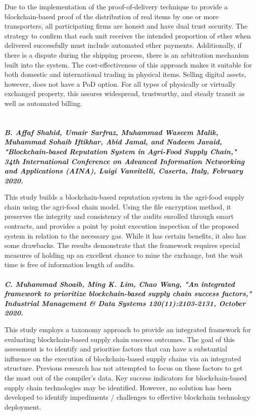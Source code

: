 \documentclass[12pt,a4paper,twocolumn,fleqn]{article}
\begin{document}
Due to the implementation of the proof-of-delivery technique to provide a blockchain-based proof of the distribution of real items by one or more transporters, all participating firms are honest and have dual trust security. The strategy to confirm that each unit receives the intended proportion of ether when delivered successfully must include automated ether payments. Additionally, if there is a dispute during the shipping process, there is an arbitration mechanism built into the system. The cost-effectiveness of this approach makes it suitable for both domestic and international trading in physical items. Selling digital assets, however, does not have a PoD option. For all types of physically or virtually exchanged property, this assures widespread, trustworthy, and steady transit as well as automated billing. \\ \\ \\

\textbf{\emph {B. Affaf Shahid, Umair Sarfraz, Muhammad Waseem Malik, Muhammad Sohaib Iftikhar, Abid Jamal, and Nadeem Javaid, "Blockchain-based Reputation System in Agri-Food Supply Chain," 34th International Conference on Advanced Information Networking and Applications (AINA), Luigi Vanvitelli, Caserta, Italy, February 2020.}}

This study builds a blockchain-based reputation system in the agri-food supply chain using the agri-food chain model. Using the file encryption method, it preserves the integrity and consistency of the audits enrolled through smart contracts, and provides a point by point execution inspection of the proposed system in relation to the necessary gas. While it has certain benefits, it also has some drawbacks. The results demonstrate that the framework requires special measures of holding up an excellent chance to mine the exchange, but the wait time is free of information length of audits. \\ \\

\textbf{\emph {C. Muhammad Shoaib, Ming K. Lim, Chao Wang, "An integrated framework to prioritize blockchain-based supply chain success factors," Industrial Management \& Data Systems 120(11):2103-2131, October 2020.}}

This study employs a taxonomy approach to provide an integrated framework for evaluating blockchain-based supply chain success outcomes. The goal of this assessment is to identify and prioritise factors that can have a substantial influence on the execution of blockchain-based supply chains via an integrated structure. Previous research has not attempted to focus on these factors to get the most out of the compiler's data. Key success indicators for blockchain-based supply chain technologies may be identified. However, no solution has been developed to identify impediments / challenges to effective blockchain technology deployment. \\ \\
\end{document}

